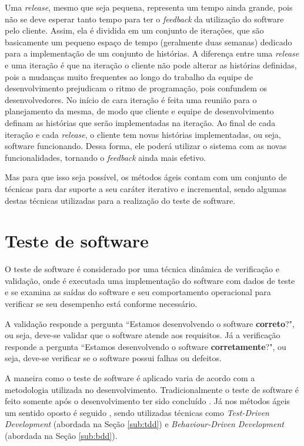 Uma \textit{release}, mesmo que seja pequena, representa um tempo ainda grande, pois não se deve esperar tanto tempo para ter o \textit{feedback} da utilização do software pelo cliente. Assim, ela é dividida em um conjunto de iterações, que são basicamente um pequeno espaço de tempo (geralmente duas semanas) dedicado para a implementação de um conjunto de histórias. A diferença entre uma \textit{release} e uma iteração é que na iteração o cliente não pode alterar as histórias definidas, pois a mudanças muito frequentes ao longo do trabalho da equipe de desenvolvimento prejudicam o ritmo de programação, pois confundem os desenvolvedores. No início de cara iteração é feita uma reunião para o planejamento da mesma, de modo que cliente e equipe de desenvolvimento definam as histórias que serão implementadas na iteração. Ao final de cada iteração e cada \textit{release}, o cliente tem novas histórias implementadas, ou seja, software funcionando. Dessa forma, ele poderá utilizar o sistema com as novas funcionalidades, tornando o \textit{feedback} ainda mais efetivo.

Mas para que isso seja possível, os métodos ágeis contam com um conjunto de técnicas para dar suporte a seu caráter iterativo e incremental, sendo algumas destas técnicas utilizadas para a realização do teste de software.


\section{Teste de software}
\label{sec:teste_de_software}

O teste de software é considerado por \cite{Sommerville} uma técnica dinâmica de verificação e validação, onde é executada uma implementação do software com dados de teste e se examina as saídas do software e seu comportamento operacional para verificar se seu desempenho está conforme necessário.

A validação responde a pergunta ``Estamos desenvolvendo o software \textbf{correto}?", ou seja, deve-se validar que o software atende aos requisitos. Já a verificação responde a pergunta ``Estamos desenvolvendo o software \textbf{corretamente}?", ou seja, deve-se verificar se o software possui falhas ou defeitos.

A maneira como o teste de software é aplicado varia de acordo com a metodologia utilizada no desenvolvimento. Tradicionalmente o teste de software é feito somente após o desenvolvimento ter sido concluído \cite{TesteSoftware, Pressman}. Já nos métodos ágeis um sentido oposto é seguido \cite{ArtOfAgileDevelopment}, sendo utilizadas técnicas como \textit{Test-Driven Development} (abordada na Seção \ref{sub:tdd}) e \textit{Behaviour-Driven Development} (abordada na Seção \ref{sub:bdd}).

